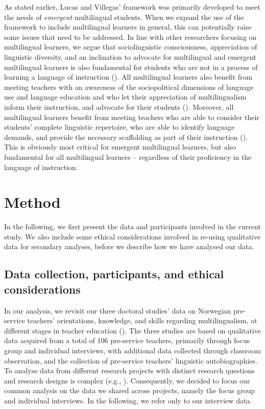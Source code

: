 \documentclass[output=paper]{langscibook}
\begin{document}
As stated earlier, Lucas and Villegas’ framework was primarily developed to meet the needs of \textit{emergent} multilingual students. When we expand the use of the framework to include multilingual learners in general, this can potentially raise some issues that need to be addressed. In line with other researchers focusing on multilingual learners, we argue that sociolinguistic consciousness, appreciation of linguistic diversity, and an inclination to advocate for multilingual and emergent multilingual learners is also fundamental for students who are not in a process of learning a language of instruction (\citealt{Garcia2016-1,Garcia2014-4}). All multilingual learners also benefit from meeting teachers with an awareness of the sociopolitical dimensions of language use and language education and who let their appreciation of multilingualism inform their instruction, and advocate for their students (\citealt{Garcia2017-1}). Moreover, all multilingual learners benefit from meeting teachers who are able to consider their students’ complete linguistic repertoire, who are able to identify language demands, and provide the necessary scaffolding as part of their instruction (\citealt{Garcia2016-1,Garcia2014-4}). This is obviously most critical for emergent multilingual learners, but also fundamental for all multilingual learners – regardless of their proficiency in the language of instruction.

\section{Method}

In the following, we first present the data and participants involved in the current study. We also include some ethical considerations involved in re-using qualitative data for secondary analyses, before we describe how we have analysed our data. 

\subsection{Data collection, participants, and ethical considerations} 
\begin{sloppypar}
In our analysis, we revisit our three doctoral studies’ data on Norwegian pre-service teachers’ orientations, knowledge, and skills regarding multilingualism, at different stages in teacher education (\citealt{Fylkesnes2019,Iversen2020,Thomassen2021}). The three studies are based on qualitative data acquired from a total of 106 pre-service teachers, primarily through focus group and individual interviews, with additional data collected through classroom observation, and the collection of pre-service teachers’ linguistic autobiographies. To analyse data from different research projects with distinct research questions and research designs is complex (e.g., \citealt{IrwinWinterton2011}). Consequently, we decided to focus our common analysis on the data we shared across projects, namely the focus group and individual interviews. In the following, we refer only to our interview data.
\end{sloppypar}
\end{document}
